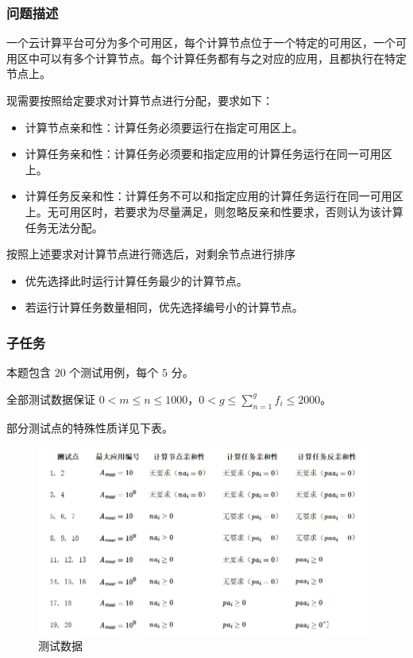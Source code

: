 \documentclass[UTF8, 12pt, a4paper, oneside]{ctexart}
\begin{document}
\subsubsection{问题描述}
\par 一个云计算平台可分为多个可用区，每个计算节点位于一个特定的可用区，一个可用区中可以有多个计算节点。每个计算任务都有与之对应的应用，且都执行在特定节点上。
\par 现需要按照给定要求对计算节点进行分配，要求如下：
\begin{itemize}
    \item 计算节点亲和性：计算任务必须要运行在指定可用区上。
    \item 计算任务亲和性：计算任务必须要和指定应用的计算任务运行在同一可用区上。
    \item 计算任务反亲和性：计算任务不可以和指定应用的计算任务运行在同一可用区上。无可用区时，若要求为尽量满足，则忽略反亲和性要求，否则认为该计算任务无法分配。
\end{itemize}
\par 按照上述要求对计算节点进行筛选后，对剩余节点进行排序
\begin{itemize}
    \item 优先选择此时运行计算任务最少的计算节点。
    \item 若运行计算任务数量相同，优先选择编号小的计算节点。
\end{itemize}
\subsubsection{子任务}
\par 本题包含 $20$ 个测试用例，每个 $5$ 分。
\par 全部测试数据保证 $0 < m \leq n \leq 1000$，$0 < g \leq\sum_{n = 1}^{g}f_i \leq 2000$。
\par 部分测试点的特殊性质详见下表。
\begin{figure}[htbp]
    \centering
    \includegraphics[width = 5in]{测试数据.png}
    \caption{测试数据}
\end{figure}
\newpage
\end{document}
